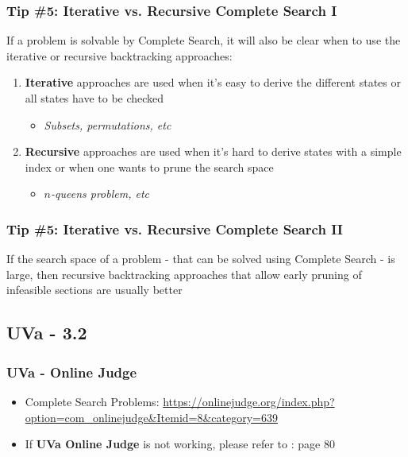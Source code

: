 \documentclass{beamer}
\begin{document}
\begin{frame}[fragile]
\frametitle{Tip \#5: Iterative vs. Recursive Complete Search I}

If a problem is solvable by Complete Search, it will also be clear when to use the iterative or recursive backtracking approaches:

\begin{enumerate}
    \item \textbf{Iterative} approaches are used when it's easy to derive the different states or all states have to be checked
    	\begin{itemize}
		    \item \textit{Subsets, permutations, etc}
		\end{itemize}
	\item \textbf{Recursive} approaches are used when it's hard to derive states with a simple index or when one wants to prune the search space
    	\begin{itemize}
		    \item \textit{$n$-queens problem, etc}
		\end{itemize}
\end{enumerate}

\end{frame}

\begin{frame}[fragile]
\frametitle{Tip \#5: Iterative vs. Recursive Complete Search II}

\color{blue}If the search space of a problem - that can be solved using Complete Search - is large, then recursive backtracking approaches that allow early pruning of infeasible sections are usually better\color{black}

\end{frame}


\subsection{UVa - 3.2}
\begin{frame}[fragile]
\frametitle{UVa - Online Judge}
	\begin{itemize}
	    \item Complete Search Problems: \url{https://onlinejudge.org/index.php?option=com_onlinejudge&Itemid=8&category=639}
	    \item If \textbf{UVa Online Judge} is not working, please refer to \cite{Halim}: page 80
	\end{itemize}
\end{frame}
\end{document}
